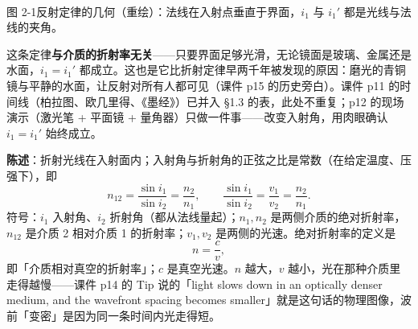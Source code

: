 \documentclass[11pt]{ctexart}
\begin{document}
\begin{center}\begin{minipage}{0.97\linewidth}\centering
{}\\
{\small 图 2-1\quad 反射定律的几何（重绘）：法线在入射点垂直于界面，$i_1$ 与 $i_1'$ 都是光线与法线的夹角。}
\end{minipage}\end{center}

这条定律\textbf{与介质的折射率无关}——只要界面足够光滑，无论镜面是玻璃、金属还是水面，$i_1=i_1'$ 都成立。这也是它比折射定律早两千年被发现的原因：磨光的青铜镜与平静的水面，让反射对所有人都可见（课件 p15 的历史旁白）。课件 p11 的时间线（柏拉图、欧几里得、《墨经》）已并入 §1.3 的表，此处不重复；p12 的现场演示（激光笔 + 平面镜 + 量角器）只做一件事——改变入射角，用肉眼确认 $i_1=i_1'$ 始终成立。

\textbf{陈述}：折射光线在入射面内；入射角与折射角的正弦之比是常数（在给定温度、压强下），即
\[
n_{12}=\frac{\sin i_1}{\sin i_2}=\frac{n_2}{n_1},
\qquad
\frac{\sin i_1}{\sin i_2}=\frac{v_1}{v_2}=\frac{n_2}{n_1}.
\]
符号：$i_1$ 入射角、$i_2$ 折射角（都从法线量起）；$n_1,n_2$ 是两侧介质的绝对折射率，$n_{12}$ 是介质 2 相对介质 1 的折射率；$v_1,v_2$ 是两侧的光速。绝对折射率的定义是
\[
n=\frac{c}{v},
\]
即「介质相对真空的折射率」；$c$ 是真空光速。$n$ 越大，$v$ 越小，光在那种介质里走得越慢——课件 p14 的 Tip 说的「light slows down in an optically denser medium, and the wavefront spacing becomes smaller」就是这句话的物理图像，波前「变密」是因为同一条时间内光走得短。
\end{document}
